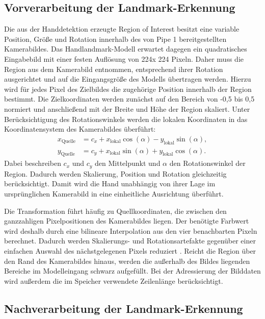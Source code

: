 \subsection{Vorverarbeitung der Landmark-Erkennung}\label{sub:landmark-vorverarbeitung}

Die aus der Handdetektion erzeugte Region of Interest besitzt eine variable Position, Größe und Rotation innerhalb des von Pipe 1 bereitgestellten Kamerabildes. Das Handlandmark-Modell erwartet dagegen ein quadratisches Eingabebild mit einer festen Auflösung von 224x 224 Pixeln. Daher muss die Region aus dem Kamerabild entnommen, entsprechend ihrer Rotation ausgerichtet und auf die Eingangsgröße des Modells übertragen werden. Hierzu wird für jedes Pixel des Zielbildes die zugehörige Position innerhalb der Region bestimmt. Die Zielkoordinaten werden zunächst auf den Bereich von {-}0,5 bis 0,5 normiert und anschließend mit der Breite und Höhe der Region skaliert. Unter Berücksichtigung des Rotationswinkels werden die lokalen Koordinaten in das Koordinatensystem des Kamerabildes überführt:
$$\begin{aligned}
x_{\mathrm{Quelle}}
&=
c_x+x_{\mathrm{lokal}}\cos(\alpha)
-y_{\mathrm{lokal}}\sin(\alpha),\\
y_{\mathrm{Quelle}}
&=
c_y+x_{\mathrm{lokal}}\sin(\alpha)
+y_{\mathrm{lokal}}\cos(\alpha).
\end{aligned}
$$
Dabei beschreiben $c_x$ und $c_y$ den Mittelpunkt und $\alpha$ den Rotationswinkel der Region. Dadurch werden Skalierung, Position und Rotation gleichzeitig berücksichtigt. Damit wird die Hand unabhängig von ihrer Lage im ursprünglichen Kamerabild in eine einheitliche Ausrichtung überführt.

Die Transformation führt häufig zu Quellkoordinaten, die zwischen den ganzzahligen Pixelpositionen des Kamerabildes liegen. Der benötigte Farbwert wird deshalb durch eine bilineare Interpolation aus den vier benachbarten Pixeln berechnet. Dadurch werden Skalierungs- und Rotationsartefakte gegenüber einer einfachen Auswahl des nächstgelegenen Pixels reduziert \cite[s. 243]{getreuerLinearMethodsImage2011}. Reicht die Region über den Rand des Kamerabildes hinaus, werden die außerhalb des Bildes liegenden Bereiche im Modelleingang schwarz aufgefüllt. Bei der Adressierung der Bilddaten wird außerdem die im Speicher verwendete Zeilenlänge berücksichtigt. 

\subsection{Nachverarbeitung der Landmark-Erkennung}\label{sub:landmark-nachverarbeitung}



